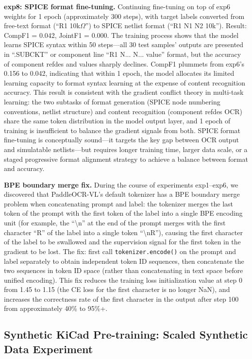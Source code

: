 \textbf{exp8: SPICE format fine-tuning.}
Continuing fine-tuning on top of exp6 weights for 1 epoch (approximately 300 steps), with target labels converted from free-text format (``R1  10k$\Omega$'') to SPICE netlist format (``R1 N1 N2 10k''). Result: CompF1 = 0.042, JointF1 = 0.000. The training process shows that the model learns SPICE syntax within 50 steps---all 30 test samples' outputs are presented in ``.SUBCKT'' or component line ``R1 N... N... value'' format, but the accuracy of component refdes and values sharply declines. CompF1 plummets from exp6's 0.156 to 0.042, indicating that within 1 epoch, the model allocates its limited learning capacity to format syntax learning at the expense of content recognition accuracy. This result is consistent with the gradient conflict theory in multi-task learning: the two subtasks of format generation (SPICE node numbering conventions, netlist structure) and content recognition (component refdes OCR) share the same token distribution in the model output layer, and 1 epoch of training is insufficient to balance the gradient signals from both. SPICE format fine-tuning is conceptually sound---it targets the key gap between OCR output and simulatable netlists---but requires longer training time, larger data scale, or a staged progressive format alignment strategy to achieve a balance between format and accuracy.

\textbf{BPE boundary merge fix.}
During the course of experiments exp1--exp6, we discovered that PaddleOCR-VL's default tokenizer has a BPE boundary merge problem when concatenating prompt and label: the tokenizer merges the last token of the prompt with the first token of the label into a single BPE encoding unit (for example, the ``\textbackslash n'' at the end of the prompt merges with the first character ``R'' of the label into a single token ``\textbackslash nR''), causing the first character of the label to be swallowed and the supervision signal for the first token in the gradient to be lost. The fix: first call \texttt{tokenizer.encode()} on the prompt and label separately to obtain independent token ID sequences, then concatenate the two sequences in token ID space (rather than concatenating in text space before unified encoding). This fix reduces the training loss initialization value at step 0 from 1.45 to 1.15 (the CE loss for the first character is no longer NaN), and increases the correctness rate of the first character in the output after step 100 from approximately 40\% to 95\%+.

\subsection{Synthetic KiCad Pre-training: Scaled Synthetic Data Experiment}

